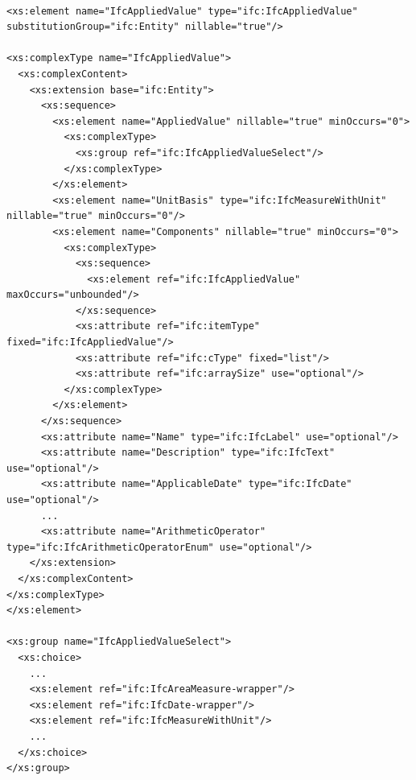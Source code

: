 









\begin{lstlisting}[caption={ifcXML4 XSD schema: Element \texttt{IfcAppliedValue} and related types},label=lst:ifc-xsd-type-IfcAppliedValue]
  
<xs:element name="IfcAppliedValue" type="ifc:IfcAppliedValue" substitutionGroup="ifc:Entity" nillable="true"/>

<xs:complexType name="IfcAppliedValue">
  <xs:complexContent>
    <xs:extension base="ifc:Entity">
      <xs:sequence>
        <xs:element name="AppliedValue" nillable="true" minOccurs="0">
          <xs:complexType>
            <xs:group ref="ifc:IfcAppliedValueSelect"/>
          </xs:complexType>
        </xs:element>
        <xs:element name="UnitBasis" type="ifc:IfcMeasureWithUnit" nillable="true" minOccurs="0"/>
        <xs:element name="Components" nillable="true" minOccurs="0">
          <xs:complexType>
            <xs:sequence>
              <xs:element ref="ifc:IfcAppliedValue" maxOccurs="unbounded"/>
            </xs:sequence>
            <xs:attribute ref="ifc:itemType" fixed="ifc:IfcAppliedValue"/>
            <xs:attribute ref="ifc:cType" fixed="list"/>
            <xs:attribute ref="ifc:arraySize" use="optional"/>
          </xs:complexType>
        </xs:element>
      </xs:sequence>
      <xs:attribute name="Name" type="ifc:IfcLabel" use="optional"/>
      <xs:attribute name="Description" type="ifc:IfcText" use="optional"/>
      <xs:attribute name="ApplicableDate" type="ifc:IfcDate" use="optional"/>
      ...
      <xs:attribute name="ArithmeticOperator" type="ifc:IfcArithmeticOperatorEnum" use="optional"/>
    </xs:extension>
  </xs:complexContent>
</xs:complexType>
</xs:element>

<xs:group name="IfcAppliedValueSelect">
  <xs:choice>
    ...
    <xs:element ref="ifc:IfcAreaMeasure-wrapper"/>
    <xs:element ref="ifc:IfcDate-wrapper"/>
    <xs:element ref="ifc:IfcMeasureWithUnit"/>
    ...
  </xs:choice>
</xs:group>


\end{lstlisting}
